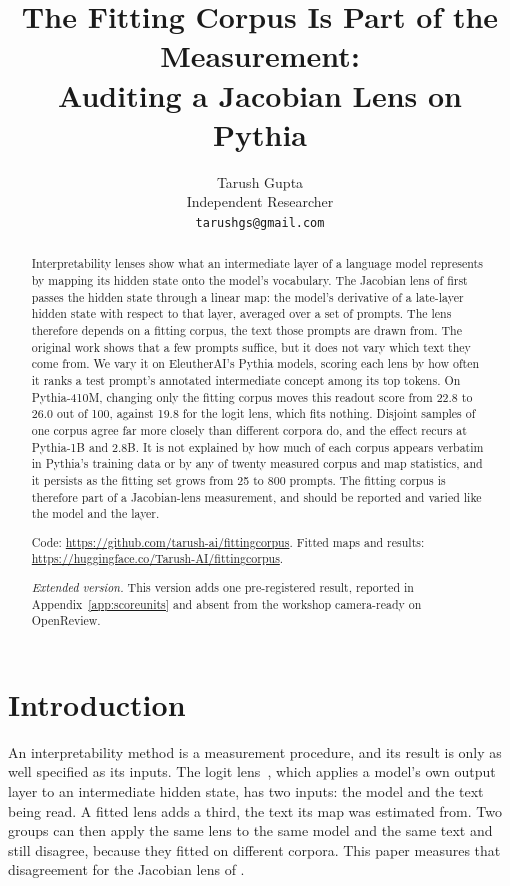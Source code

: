 \documentclass{article}
\title{The Fitting Corpus Is Part of the Measurement:\\Auditing a Jacobian Lens on Pythia}
\author{%
  Tarush Gupta\\
  Independent Researcher\\
  \texttt{tarushgs@gmail.com}
}
\begin{document}
\maketitle

\begin{abstract}
Interpretability lenses show what an intermediate layer of a language model represents by mapping
its hidden state onto the model's vocabulary. The Jacobian lens of \citet{gurnee2026} first passes
the hidden state through a linear map: the model's derivative of a late-layer hidden state with
respect to that layer, averaged over a set of prompts. The lens therefore depends on a fitting
corpus, the text those prompts are drawn from. The original work shows that a few prompts suffice,
but it does not vary which text they come from. We vary it on EleutherAI's Pythia models, scoring
each lens by how often it ranks a test prompt's annotated intermediate concept among its top tokens.
On Pythia-410M, changing only the fitting corpus moves this readout score from 22.8 to 26.0 out of
100, against 19.8 for the logit lens, which fits nothing. Disjoint samples of one corpus agree far
more closely than different corpora do, and the effect recurs at Pythia-1B and 2.8B. It is not
explained by how much of each corpus appears verbatim in Pythia's training data or by any of twenty
measured corpus and map statistics, and it persists as the fitting set grows from 25 to 800 prompts.
The fitting corpus is therefore part of a Jacobian-lens measurement, and should be reported and
varied like the model and the layer.\par
Code: \url{https://github.com/tarush-ai/fittingcorpus}.
Fitted maps and results: \url{https://huggingface.co/Tarush-AI/fittingcorpus}.
\ifdefined\EXTENDED\par\emph{Extended version.} This version adds one pre-registered result,
reported in Appendix~\ref{app:scoreunits} and absent from the workshop camera-ready on OpenReview.\fi
\end{abstract}

\section{Introduction}

An interpretability method is a measurement procedure, and its result is only as well specified as
its inputs. The logit lens~\citep{nostalgebraist2020}, which applies a model's own output layer to an
intermediate hidden state, has two inputs: the model and the text being read. A fitted lens adds a
third, the text its map was estimated from. Two groups can then apply the same lens to the same model
and the same text and still disagree, because they fitted on different corpora. This paper measures
that disagreement for the Jacobian lens of \citet{gurnee2026}.
\end{document}

